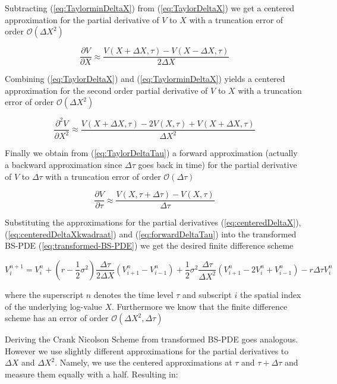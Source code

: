 \documentclass[11pt,a4paper]{article}
\begin{document}
Subtracting (\ref{eq:TaylorminDeltaX}) from (\ref{eq:TaylorDeltaX}) we get a centered approximation for the partial derivative of $V$ to $X$ with a truncation error of order $\mathcal{O}(\Delta X^2)$

\begin{equation}
\frac{\partial V}{\partial X}\approx \frac{V(X+\Delta X,\tau)-V(X-\Delta X,\tau)}{2\Delta X}
\label{eq:centeredDeltaX}
\end{equation}

Combining (\ref{eq:TaylorDeltaX}) and (\ref{eq:TaylorminDeltaX}) yields a centered approximation for the second order partial derivative of $V$ to $X$ with a truncation error of order $\mathcal{O}(\Delta X^2)$

\begin{equation}
\frac{\partial^2 V}{\partial X^2}\approx \frac{V(X+\Delta X,\tau)-2V(X,\tau)+V(X+\Delta X,\tau)}{\Delta X^2}
\label{eq:centeredDeltaXkwadraat}
\end{equation}

Finally we obtain from (\ref{eq:TaylorDeltaTau}) a forward approximation (actually a backward approximation since $\Delta \tau$ goes back in time) for the partial derivative of $V$ to $\Delta \tau$ with a truncation error of order $\mathcal{O}(\Delta \tau)$

\begin{equation}
\frac{\partial V}{\partial \tau}\approx \frac{V(X,\tau+\Delta \tau)-V(X,\tau)}{\Delta \tau}
\label{eq:forwardDeltaTau}
\end{equation}

Substituting the approximations for the partial derivatives (\ref{eq:centeredDeltaX}), (\ref{eq:centeredDeltaXkwadraat}) and (\ref{eq:forwardDeltaTau}) into the transformed BS-PDE (\ref{eq:transformed-BS-PDE}) we get the desired finite difference scheme

\begin{equation}
V_i^{n+1}=V_i^n+\left(r-\frac{1}{2}\sigma^2\right)\frac{\Delta \tau}{2 \Delta X}(V_{i+1}^n-V_{i-1}^n)+\frac{1}{2}\sigma^2\frac{\Delta \tau}{\Delta X^2}(V_{i+1}^n-2V_i^n+V_{i-1}^n)-r\Delta\tau V_i^n
\label{eq:FD}
\end{equation}

where the superscript $n$ denotes the time level $\tau$ and subscript $i$ the spatial index of the underlying log-value $X$. Furthermore we know that the finite difference scheme has an error of order $\mathcal{O}(\Delta X^2,\Delta \tau)$

Deriving the Crank Nicolson Scheme from transformed BS-PDE goes analogous. However we use slightly different approximations for the partial derivatives to $\Delta X$ and $\Delta X^2$. Namely, we use the centered approximations at $\tau$ and $\tau+\Delta \tau$ and measure them equally with a half. Resulting in:
\end{document}
